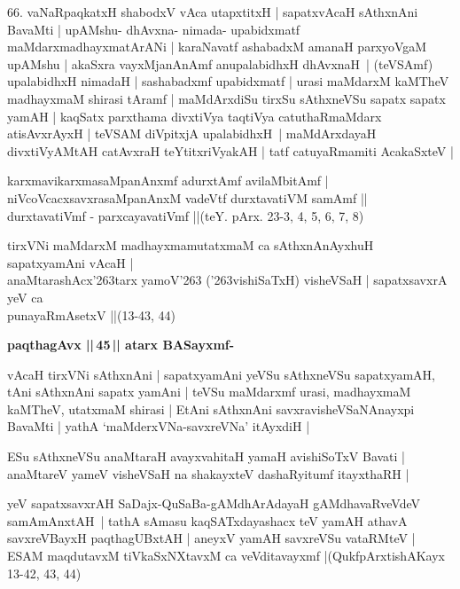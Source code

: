 \begin{artha}
66. vaNaRpaqkatxH shabodxV vAca utapxtitxH | sapatxvAcaH sAthxnAni BavaMti |\label{153c}
upAMshu- dhAvxna- nimada- upabidxmatf maMdarxmadhayxmatArANi | karaNavatf
ashabadxM amanaH parxyoVgaM upAMshu | akaSxra vayxMjanAnAmf anupalabidhxH dhAvxnaH~|
(teVSAmf) upalabidhxH nimadaH | sashabadxmf upabidxmatf | urasi maMdarxM kaMTheV madhayxmaM shirasi tAramf | maMdArxdiSu tirxSu sAthxneVSu sapatx sapatx yamAH | kaqSatx parxthama divxtiVya taqtiVya catuthaRmaMdarx atisAvxrAyxH | teVSAM diVpitxjA upalabidhxH~| maMdArxdayaH divxtiVyAMtAH catAvxraH teYtitxriVyakAH | tatf catuyaRmamiti AcakaSxteV |
\end{artha}

\begin{shloka}
karxmavikarxmasaMpanAnxmf adurxtAmf avilaMbitAmf |\\
niVcoVcacxsavxrasaMpanAnxM vadeVtf durxtavatiVM samAmf ||\\
durxtavatiVmf - parxcayavatiVmf ||\hfill{(teY. pArx. 23-3, 4, 5, 6, 7, 8)}
\end{shloka}

\begin{shloka}
tirxVNi maMdarxM madhayxmamutatxmaM ca sAthxnAnAyxhuH sapatxyamAni vAcaH |\\\label{154}
anaMtarashAcx\char'263tarx yamoV\char'263 (\char'263vishiSaTxH) visheVSaH |
sapatxsavxrA yeV ca\\
punayaRmAsetxV ||\hfill{(13-43, 44)}
\end{shloka}

{\bigskip
\noindent
{\large\bf paqthagAvx ||\,45\,|| atarx BASayxmf-}}
\medskip

\noindent
\begin{artha}
vAcaH tirxVNi sAthxnAni | sapatxyamAni yeVSu sAthxneVSu sapatxyamAH, tAni sAthxnAni sapatx yamAni | teVSu maMdarxmf urasi, madhayxmaM kaMTheV, utatxmaM shirasi | EtAni sAthxnAni savxravisheVSaNAnayxpi BavaMti | yathA `maMderxVNa-savxreVNa' itAyxdiH |
\end{artha}

\begin{shloka}
ESu sAthxneVSu anaMtaraH avayxvahitaH yamaH avishiSoTxV Bavati |\\
anaMtareV yameV visheVSaH na shakayxteV dashaRyitumf itayxthaRH |
\end{shloka}

\noindent
\begin{artha}
yeV sapatxsavxrAH SaDajx-QuSaBa-gAMdhArAdayaH gAMdhavaRveVdeV samAmAnxtAH~| tathA sAmasu kaqSATxdayashacx teV yamAH athavA savxreVBayxH paqthagUBxtAH | aneyxV yamAH savxreVSu vataRMteV | ESAM maqdutavxM tiVkaSxNXtavxM ca veVditavayxmf |\hfill{(QukfpArxtishAKayx 13-42, 43, 44)}
\end{artha}

